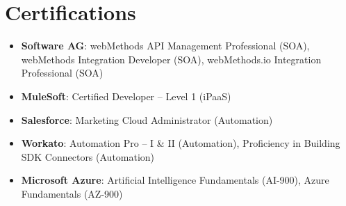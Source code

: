 \documentclass[letterpaper,10pt]{article}
\newcommand{\resumeItem}[1]{
  \item\small{
    {#1 \vspace{-2pt}}
  }
}
\newcommand{\resumeItemListStart}{\begin{itemize}[leftmargin=*, itemsep=-1pt]}
\newcommand{\resumeItemListEnd}{\end{itemize}\vspace{-5pt}}
\begin{document}
\section{Certifications}
\resumeItemListStart
  \resumeItem{\textbf{Software AG}: webMethods API Management Professional (SOA), webMethods Integration Developer (SOA), webMethods.io Integration Professional (SOA)}
  \resumeItem{\textbf{MuleSoft}: Certified Developer -- Level 1 (iPaaS)}
  \resumeItem{\textbf{Salesforce}: Marketing Cloud Administrator (Automation)}
  \resumeItem{\textbf{Workato}: Automation Pro -- I \& II (Automation), Proficiency in Building SDK Connectors (Automation)}
  \resumeItem{\textbf{Microsoft Azure}: Artificial Intelligence Fundamentals (AI-900), Azure Fundamentals (AZ-900)}
\resumeItemListEnd
\end{document}
